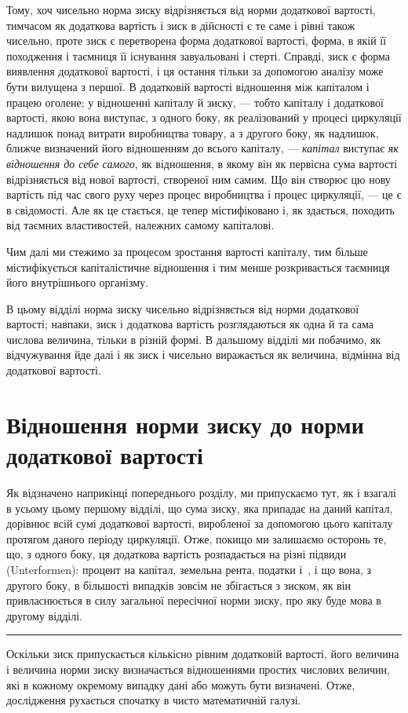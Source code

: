 Тому, хоч чисельно норма зиску відрізняється від норми додаткової
вартості, тимчасом як додаткова вартість і зиск в
дійсності є те саме і рівні також чисельно, проте зиск є перетворена
форма додаткової вартості, форма, в якій її походження
і таємниця її існування завуальовані і стерті. Справді,
зиск є форма виявлення додаткової вартості, і ця остання тільки
за допомогою аналізу може бути вилущена з першої. В додатковій
вартості відношення між капіталом і працею оголене; у
відношенні капіталу й зиску, — тобто капіталу і додаткової вартості,
якою вона виступає, з одного боку, як реалізований у
процесі циркуляції надлишок понад витрати виробництва товару,
а з другого боку, як надлишок, ближче визначений його
відношенням до всього капіталу, — \emph{капітал} виступає \emph{як відношення
до себе самого}, як відношення, в якому він як первісна
сума вартості відрізняється від нової вартості, створеної ним
самим. Що він створює цю нову вартість під час свого
руху через процес виробництва і процес циркуляції, — це є в свідомості.
Але як це стається, це тепер містифіковано і, як
здається, походить від таємних властивостей, належних самому
капіталові.

Чим далі ми стежимо за процесом зростання вартості капіталу,
тим більше містифікується капіталістичне відношення і тим
менше розкривається таємниця його внутрішнього організму.

В цьому відділі норма зиску чисельно відрізняється від
норми додаткової вартості; навпаки, зиск і додаткова вартість
розглядаються як одна й та сама числова величина, тільки
в різній формі. В дальшому відділі ми побачимо, як відчужування
йде далі і як зиск і чисельно виражається як величина,
відмінна від додаткової вартості.

\section{Відношення норми зиску до норми
додаткової вартості}

Як відзначено наприкінці попереднього розділу, ми припускаємо
тут, як і взагалі в усьому цьому першому відділі, що
сума зиску, яка припадає на даний капітал, дорівнює всій сумі
додаткової вартості, виробленої за допомогою цього капіталу
протягом даного періоду циркуляції. Отже, покищо ми залишаємо
осторонь те, що, з одного боку, ця додаткова вартість
розпадається на різні підвиди (Unterformen): процент на капітал,
земельна рента, податки і~, і що вона, з другого боку,
в більшості випадків зовсім не збігається з зиском, як він привласнюється
в силу загальної пересічної норми зиску, про яку
буде мова в другому відділі.

\plainbreak{4}

Оскільки зиск припускається кількісно рівним додатковій
вартості, його величина і величина норми зиску визначається відношеннями
простих числових величин, які в кожному окремому
випадку дані або можуть бути визначені. Отже, дослідження
рухається спочатку в чисто математичній галузі.
